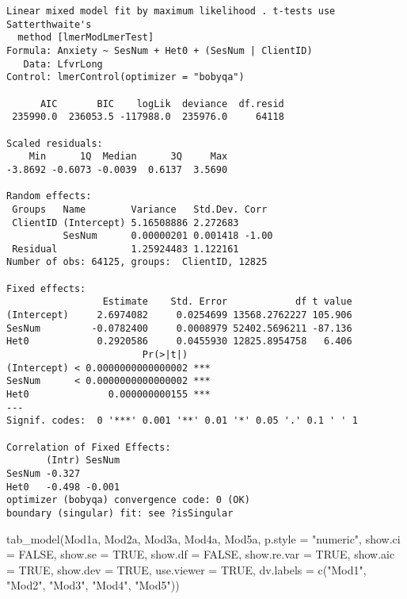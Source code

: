\documentclass[
  11pt,
]{book}
\newenvironment{Shaded}{\begin{snugshade}}{\end{snugshade}}
\newcommand{\AttributeTok}[1]{\textcolor[rgb]{0.77,0.63,0.00}{#1}}
\newcommand{\ConstantTok}[1]{\textcolor[rgb]{0.00,0.00,0.00}{#1}}
\newcommand{\FunctionTok}[1]{\textcolor[rgb]{0.00,0.00,0.00}{#1}}
\newcommand{\NormalTok}[1]{#1}
\newcommand{\StringTok}[1]{\textcolor[rgb]{0.31,0.60,0.02}{#1}}
\begin{document}
\begin{verbatim}
Linear mixed model fit by maximum likelihood . t-tests use Satterthwaite's
  method [lmerModLmerTest]
Formula: Anxiety ~ SesNum + Het0 + (SesNum | ClientID)
   Data: LfvrLong
Control: lmerControl(optimizer = "bobyqa")

      AIC       BIC    logLik  deviance  df.resid 
 235990.0  236053.5 -117988.0  235976.0     64118 

Scaled residuals: 
    Min      1Q  Median      3Q     Max 
-3.8692 -0.6073 -0.0039  0.6137  3.5690 

Random effects:
 Groups   Name        Variance   Std.Dev. Corr 
 ClientID (Intercept) 5.16508886 2.272683      
          SesNum      0.00000201 0.001418 -1.00
 Residual             1.25924483 1.122161      
Number of obs: 64125, groups:  ClientID, 12825

Fixed effects:
                 Estimate    Std. Error            df t value
(Intercept)     2.6974082     0.0254699 13568.2762227 105.906
SesNum         -0.0782400     0.0008979 52402.5696211 -87.136
Het0            0.2920586     0.0455930 12825.8954758   6.406
                        Pr(>|t|)    
(Intercept) < 0.0000000000000002 ***
SesNum      < 0.0000000000000002 ***
Het0              0.000000000155 ***
---
Signif. codes:  0 '***' 0.001 '**' 0.01 '*' 0.05 '.' 0.1 ' ' 1

Correlation of Fixed Effects:
       (Intr) SesNum
SesNum -0.327       
Het0   -0.498 -0.001
optimizer (bobyqa) convergence code: 0 (OK)
boundary (singular) fit: see ?isSingular
\end{verbatim}

\begin{Shaded}
\begin{Highlighting}[]
\FunctionTok{tab\_model}\NormalTok{(Mod1a, Mod2a, Mod3a, Mod4a, Mod5a, }\AttributeTok{p.style =} \StringTok{"numeric"}\NormalTok{, }\AttributeTok{show.ci =} \ConstantTok{FALSE}\NormalTok{, }\AttributeTok{show.se =} \ConstantTok{TRUE}\NormalTok{, }\AttributeTok{show.df =} \ConstantTok{FALSE}\NormalTok{, }\AttributeTok{show.re.var =} \ConstantTok{TRUE}\NormalTok{, }\AttributeTok{show.aic =} \ConstantTok{TRUE}\NormalTok{, }\AttributeTok{show.dev =} \ConstantTok{TRUE}\NormalTok{, }\AttributeTok{use.viewer =} \ConstantTok{TRUE}\NormalTok{, }\AttributeTok{dv.labels =} \FunctionTok{c}\NormalTok{(}\StringTok{"Mod1"}\NormalTok{, }\StringTok{"Mod2"}\NormalTok{, }\StringTok{"Mod3"}\NormalTok{, }\StringTok{"Mod4"}\NormalTok{, }\StringTok{"Mod5"}\NormalTok{))}
\end{Highlighting}
\end{Shaded}
\end{document}
